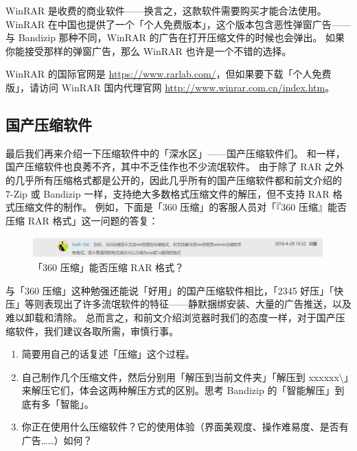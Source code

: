 WinRAR 是收费的商业软件——换言之，这款软件需要购买才能合法使用。
WinRAR 在中国也提供了一个「个人免费版本」，这个版本包含恶性弹窗广告——与 Bandizip 那种不同，WinRAR 的广告在打开压缩文件的时候也会弹出。
如果你能接受那样的弹窗广告，那么 WinRAR 也许是一个不错的选择。

WinRAR 的国际官网是 \url{https://www.rarlab.com/}，但如果要下载「个人免费版」，请访问 WinRAR 国内代理官网 \url{http://www.winrar.com.cn/index.htm}。

\subsection{国产压缩软件}

最后我们再来介绍一下压缩软件中的「深水区」——国产压缩软件们。
和一样，国产压缩软件也良莠不齐，其中不乏佳作也不少流氓软件。
由于除了 RAR 之外的几乎所有压缩格式都是公开的，因此几乎所有的国产压缩软件都和前文介绍的 7-Zip 或 Bandizip 一样，支持绝大多数格式压缩文件的解压，但不支持 RAR 格式压缩文件的制作。
例如，下面是「360 压缩」的客服人员对「『360 压缩』能否压缩 RAR 格式」这一问题的答复：

\begin{figure}[htb!]
  \centering
  \includegraphics[width=12cm]{assets/360_Zip.jpg}
  \caption{「360 压缩」能否压缩 RAR 格式？}
  \label{360_Zip}
\end{figure}

与「360 压缩」这种勉强还能说「好用」的国产压缩软件相比，「2345 好压」「快压」等则表现出了许多流氓软件的特征——静默捆绑安装、大量的广告推送，以及难以卸载和清除。
总而言之，和前文介绍浏览器时我们的态度一样，对于国产压缩软件，我们建议各取所需，审慎行事。

\practice

\begin{enumerate}
  \item 简要用自己的话复述「压缩」这个过程。
  \item 自己制作几个压缩文件，然后分别用「解压到当前文件夹」「解压到 xxxxxx\textbackslash 」来解压它们，体会这两种解压方式的区别。思考 Bandizip 的「智能解压」到底有多「智能」。
  \item 你正在使用什么压缩软件？它的使用体验（界面美观度、操作难易度、是否有广告……）如何？
\end{enumerate}